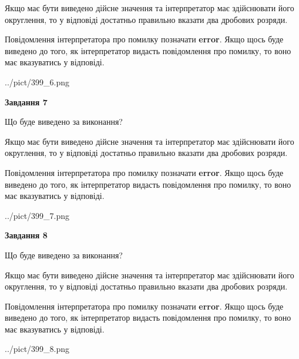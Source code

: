 \documentclass[12pt, ukrainian]{article}
\begin{document}
{\begin {Large}
Якщо має бути виведено дійсне значення та інтерпретатор має здійснювати його округлення, 
то у відповіді достатньо правильно вказати два дробових розряди.

Повідомлення інтерпретатора про помилку позначати \textbf{error}.
Якщо щось буде виведено до того, як інтерпретатор видасть повідомлення про помилку, 
то воно має вказуватись у відповіді. \par

\begin{center}
	{../pict/399_6.png}
\end{center}
\newpage

{\begin {center}\textbf{Завдання 7}\end {center}}\par
Що буде виведено за виконання? \par

Якщо має бути виведено дійсне значення та інтерпретатор має здійснювати його округлення, 
то у відповіді достатньо правильно вказати два дробових розряди.

Повідомлення інтерпретатора про помилку позначати \textbf{error}.
Якщо щось буде виведено до того, як інтерпретатор видасть повідомлення про помилку, 
то воно має вказуватись у відповіді. \par

\begin{center}
	{../pict/399_7.png}
\end{center}
\newpage

{\begin {center}\textbf{Завдання 8}\end {center}}\par
Що буде виведено за виконання? \par

Якщо має бути виведено дійсне значення та інтерпретатор має здійснювати його округлення, 
то у відповіді достатньо правильно вказати два дробових розряди.

Повідомлення інтерпретатора про помилку позначати \textbf{error}.
Якщо щось буде виведено до того, як інтерпретатор видасть повідомлення про помилку, 
то воно має вказуватись у відповіді. \par

\begin{center}
	{../pict/399_8.png}
\end{center}
\newpage


\end{Large}}
\end{document}
